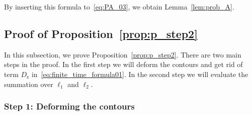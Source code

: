 \documentclass{article}
\numberwithin{equation}{section}
\newcommand{\rz}{\mathrm{z}}
\begin{document}
By inserting this formula to~\eqref{eq:PA_03}, we obtain Lemma~\ref{lem:prob_A}.

\subsection{Proof of Proposition~\ref{prop:p_step2}}
\label{sec:proof_step2}

In this subsection, we prove Proposition~\ref{prop:p_step2}. There are two main steps in the proof. In the first step we will deform the contours and get rid of term $D_\rz$ in~\eqref{eq:finite_time_formula01}. In the second step we will evaluate the summation over $\ell_1$ and $\ell_2$.

\subsubsection{Step 1: Deforming the contours}
\end{document}
